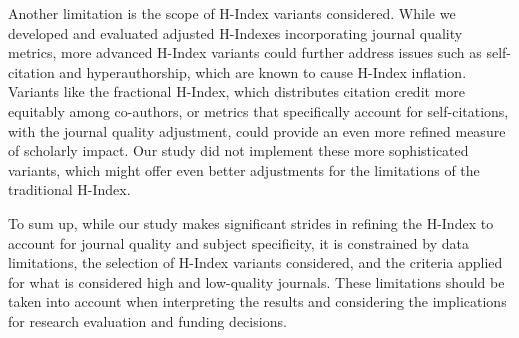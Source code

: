 Another limitation is the scope of H-Index variants considered. While we
developed and evaluated adjusted H-Indexes incorporating journal quality
metrics, more advanced H-Index variants could further address issues such as
self-citation and hyperauthorship, which are known to cause H-Index inflation.
Variants like the fractional H-Index, which distributes citation credit more
equitably among co-authors, or metrics that specifically account for
self-citations, with the journal quality adjustment, could provide an even more
refined measure of scholarly impact. Our study did not implement these more
sophisticated variants, which might offer even better adjustments for the
limitations of the traditional H-Index.

To sum up, while our study makes significant strides in refining the H-Index to
account for journal quality and subject specificity, it is constrained by data
limitations, the selection of H-Index variants considered, and the criteria
applied for what is considered high and low-quality journals. These limitations
should be taken into account when interpreting the results and considering the
implications for research evaluation and funding decisions.
